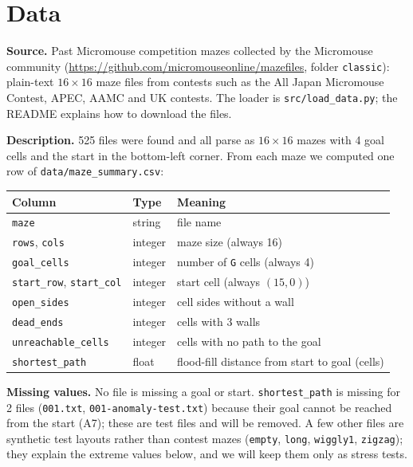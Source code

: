 \documentclass[10pt]{article}
\theoremstyle{definition}
\begin{document}
\section{Data}\label{sec:data}

\noindent\textbf{Source.} Past Micromouse competition mazes collected by the Micromouse community (\url{https://github.com/micromouseonline/mazefiles}, folder \texttt{classic}): plain-text $16\times16$ maze files from contests such as the All Japan Micromouse Contest, APEC, AAMC and UK contests. The loader is \texttt{src/load\_data.py}; the README explains how to download the files.

\textbf{Description.} 525 files were found and all parse as $16\times16$ mazes with 4 goal cells and the start in the bottom-left corner. From each maze we computed one row of \texttt{data/maze\_summary.csv}:

\begin{center}
\small
\begin{tabular}{lll}
\toprule
Column & Type & Meaning\\
\midrule
\texttt{maze} & string & file name\\
\texttt{rows}, \texttt{cols} & integer & maze size (always 16)\\
\texttt{goal\_cells} & integer & number of \texttt{G} cells (always 4)\\
\texttt{start\_row}, \texttt{start\_col} & integer & start cell (always $(15,0)$)\\
\texttt{open\_sides} & integer & cell sides without a wall\\
\texttt{dead\_ends} & integer & cells with 3 walls\\
\texttt{unreachable\_cells} & integer & cells with no path to the goal\\
\texttt{shortest\_path} & float & flood-fill distance from start to goal (cells)\\
\bottomrule
\end{tabular}
\end{center}

\textbf{Missing values.} No file is missing a goal or start. \texttt{shortest\_path} is missing for 2 files (\texttt{001.txt}, \texttt{001-anomaly-test.txt}) because their goal cannot be reached from the start (A7); these are test files and will be removed. A few other files are synthetic test layouts rather than contest mazes (\texttt{empty}, \texttt{long}, \texttt{wiggly1}, \texttt{zigzag}); they explain the extreme values below, and we will keep them only as stress tests.
\end{document}
